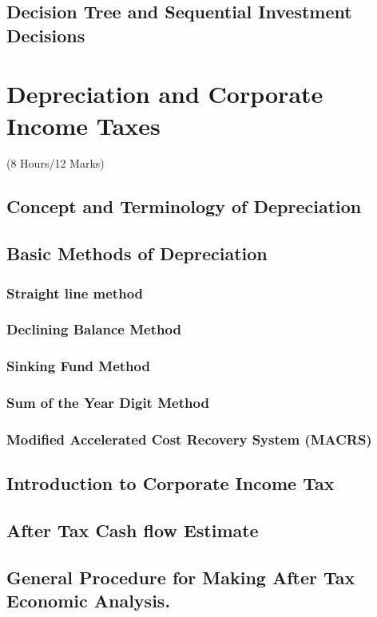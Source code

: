 \documentclass[12pt]{article}
\begin{document}
	\subsection{Decision Tree and Sequential Investment Decisions}

	\pagebreak
\section{Depreciation and Corporate Income Taxes}	
	\begin{center}(8 Hours/12 Marks)\end{center}
	\subsection{Concept and Terminology of Depreciation}
	\subsection{Basic Methods of Depreciation}
	\subsubsection{Straight line method}
	\subsubsection{Declining Balance Method}
	\subsubsection{Sinking Fund Method}
	\subsubsection{Sum of the Year Digit Method}
	\subsubsection{Modified Accelerated Cost Recovery System (MACRS)}
	\subsection{Introduction to Corporate Income Tax}
	\subsection{After Tax Cash flow Estimate}
	\subsection{General Procedure for Making After Tax Economic Analysis.}
\end{document}
